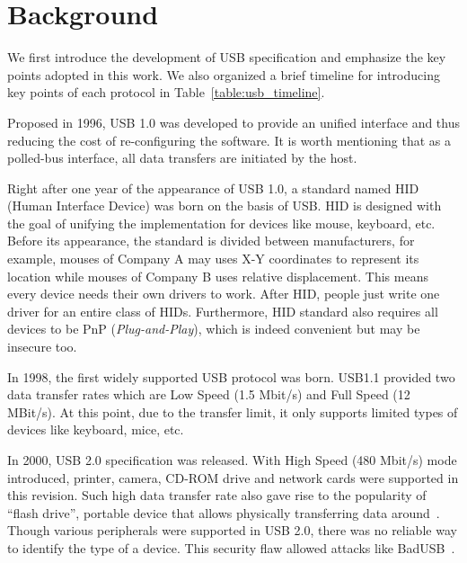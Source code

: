 \section{Background}
\label{sec:background}

We first introduce the development of USB specification and emphasize the key
points adopted in this work. We also organized a brief timeline for introducing
key points of each protocol in Table~\ref{table:usb_timeline}.

Proposed in 1996, USB 1.0\cite{usb10} was developed to provide an unified
interface and thus reducing the cost of re-configuring the software. It is
worth mentioning that as a polled-bus interface, all data transfers are
initiated by the host.

Right after one year of the appearance of USB 1.0, a standard named HID (Human
Interface Device) was born on the basis of USB. HID is
designed with the goal of unifying the implementation for devices like mouse,
keyboard, etc. Before its appearance, the standard is divided between
manufacturers, for example, mouses of Company A may uses X-Y coordinates to
represent its location while mouses of Company B uses relative displacement.
This means every device needs their own drivers to work. After HID, people just
write one driver for an entire class of HIDs. Furthermore, HID standard also
requires all devices to be PnP (\emph{Plug-and-Play}), which is indeed
convenient but may be insecure too.

In 1998, the first widely supported USB protocol was born. USB1.1\cite{usb11}
provided two data transfer rates which are Low Speed (1.5 Mbit/s) and Full
Speed (12 MBit/s). At this point, due to the transfer limit, it only supports
limited types of devices like keyboard, mice, etc.

In 2000, USB 2.0\cite{usb20} specification was released. With High Speed (480
Mbit/s) mode introduced, printer, camera, CD-ROM drive and network cards were
supported in this revision. Such high data transfer rate also gave rise to the
popularity of ``flash drive'', portable device that allows physically
transferring data around~\cite{sok}. Though various peripherals were supported
in USB 2.0, there was no reliable way to identify the type of a device. This
security flaw allowed attacks like BadUSB~\cite{rubber}.

